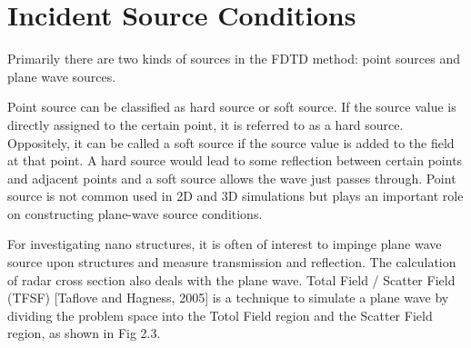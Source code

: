 \section{Incident Source Conditions}
Primarily there are two kinds of sources in the FDTD method: point sources and plane wave sources.

Point source can be classified as hard source or soft source. If the source value is directly assigned to the certain
point, it is referred to as a hard source. Oppositely, it can be called a soft source if the source value is added to
the field at that point. A hard source would lead to some reflection between certain points and adjacent points and a
soft source allows the wave just passes through. Point source is not common used in 2D and 3D simulations but plays an
important role on constructing plane-wave source conditions.

For investigating nano structures, it is often of interest to impinge plane wave source upon structures and measure
transmission and reflection. The calculation of radar cross section also deals with the plane wave. Total Field /
Scatter Field (TFSF) [Taflove and Hagness, 2005] is a technique to simulate a plane wave by dividing the problem space
into the Totol Field region and the Scatter Field region, as shown in Fig 2.3.

